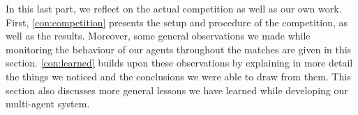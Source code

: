 In this last part, we reflect on the actual competition as well as our own work.
First, \autoref{con:competition} presents the setup and procedure of the competition, as well as the results.
Moreover, some general observations we made while monitoring the behaviour of our agents throughout the matches are given in this section.
\autoref{con:learned} builds upon these observations by explaining in more detail the things we noticed and the conclusions we were able to draw from them.
This section also discusses more general lessons we have learned while developing our multi-agent system.




